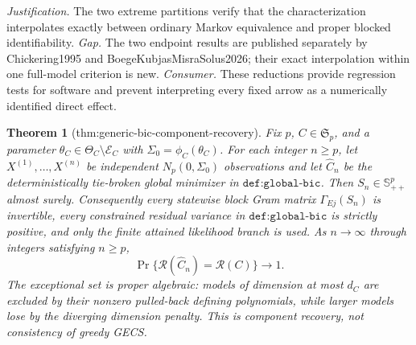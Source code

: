 \documentclass{article}
\newtheorem{theorem}{Theorem}
\begin{document}
\par\smallskip\noindent \textit{Justification.} The two extreme partitions verify that the characterization interpolates exactly between ordinary Markov equivalence and proper blocked identifiability. \textit{Gap.} The two endpoint results are published separately by Chickering1995 and BoegeKubjasMisraSolus2026; their exact interpolation within one full-model criterion is new. \textit{Consumer.} These reductions provide regression tests for software and prevent interpreting every fixed arrow as a numerically identified direct effect.

\begin{theorem}[thm:generic-bic-component-recovery]\label{thm:generic-bic-component-recovery}
Fix \(p\), \(C\in\mathfrak S_p\), and a parameter \(\theta_C\in\Theta_C\setminus\mathcal E_C\) with \(\Sigma_0=\phi_C(\theta_C)\). For each integer \(n\geq p\), let \(X^{(1)},\ldots,X^{(n)}\) be independent \(N_p(0,\Sigma_0)\) observations and let \(\widehat C_n\) be the deterministically tie-broken global minimizer in \(\texttt{def:global-bic}\). Then \(S_n\in\mathbb S^p_{++}\) almost surely. Consequently every statewise block Gram matrix \(\Gamma_{Ej}(S_n)\) is invertible, every constrained residual variance in \(\texttt{def:global-bic}\) is strictly positive, and only the finite attained likelihood branch is used. As \(n\to\infty\) through integers satisfying \(n\geq p\), \[\Pr\{\mathcal R(\widehat C_n)=\mathcal R(C)\}\longrightarrow1.\] The exceptional set is proper algebraic: models of dimension at most \(d_C\) are excluded by their nonzero pulled-back defining polynomials, while larger models lose by the diverging dimension penalty. This is component recovery, not consistency of greedy GECS.
\end{theorem}
\end{document}

